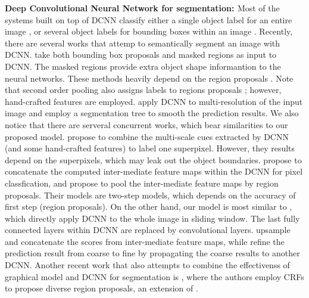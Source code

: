 {\bf{Deep Convolutional Neural Network for segmentation: }} Most of the systems built on top of DCNN classify either a single object label for an entire image \citep{KrizhevskyNIPS2013, simonyan2014very, szegedy2014going}, or several object labels for bounding boxes within an image \citep{papandreou2014untangling, girshick2014rcnn}. Recently, there are several works that attemp to semantically segment an image with DCNN. \citet{girshick2014rcnn, hariharan2014simultaneous} take both bounding box proposals and masked regions as input to DCNN. The masked regions provide extra object shape informantion to the neural networks. These methods heavily depend on the region proposals \citep{arbelaez2014multiscale, Uijlings13}. Note that second order pooling \citep{carreira2012semantic} also assigns labels to regions proposals \citep{carreira2012cpmc}; however, hand-crafted features are employed. \citet{farabet2013learning} apply DCNN to multi-resolution of the input image and employ a segmentation tree to smooth the prediction results. We also notice that there are serveral concurrent works, which bear similarities to our proposed model. \citet{mostajabi2014feedforward} propose to combine the multi-scale cues extracted by DCNN (and some hand-crafted features) to label one superpixel. However, they results depend on the superpixels, which may leak out the object boundaries. \citet{hariharan2014hypercolumns} propose to concatenate the computed inter-mediate feature maps within the DCNN for pixel classfication, and \citet{dai2014convolutional} propose to pool the inter-mediate feature maps by region proposals. Their models are two-step models, which depends on the accuracy of first step (\ie region proposals). On the other hand, our model is most similar to \citet{long2014fully, eigen2014predicting}, which directly apply DCNN to the whole image in sliding window. The last fully connected layers within DCNN are replaced by convolutional layers. \citet{long2014fully} upsample and concatenate the scores from inter-mediate feature maps, while \citet{eigen2014predicting} refine the prediction result from coarse to fine by propagating the coarse results to another DCNN. Another recent work that also attempts to combine the effectivenss of graphical model and DCNN for segmentation is \citet{cogswell2014combining}, where the authors employ CRFs to propose diverse region proposals, an extension of \citet{yadollahpour2013discriminative}.


